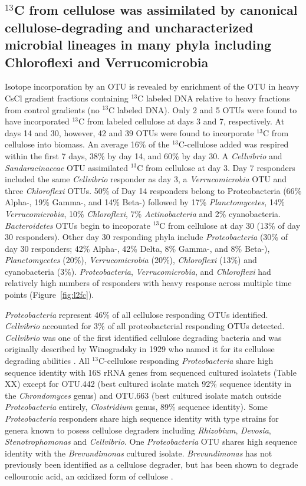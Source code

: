\subsection{$^{13}$C from cellulose was assimilated by canonical
cellulose-degrading and uncharacterized microbial lineages in many phyla
including Chloroflexi and Verrucomicrobia} 
Isotope incorporation by an OTU is revealed by enrichment of the OTU in heavy
CsCl gradient fractions containing $^{13}$C labeled DNA relative to heavy
fractions from control gradients (no $^{13}$C labeled DNA). Only 2 and 5 OTUs
were found to have incorporated $^{13}$C from labeled cellulose at days 3 and
7, respectively. At days 14 and 30, however, 42 and 39
OTUs were found to incorporate $^{13}$C from cellulose into biomass. An average
16\% of the $^{13}$C-cellulose added was respired within the first 7 days, 38\%
by day 14, and 60\% by day 30. A \textit{Cellvibrio} and
\textit{Sandaracinaceae} OTU assimilated $^{13}$C from cellulose at day 3. Day
7 responders included the same \textit{Cellvibrio} responder as day 3, a
\textit{Verrucomicrobia} OTU and three \textit{Chloroflexi} OTUs. 50\% of Day
14 responders belong to Proteobacteria (66\% Alpha-, 19\% Gamma-, and 14\%
Beta-) followed by 17\% \textit{Planctomycetes}, 14\% \textit{Verrucomicrobia},
10\% \textit{Chloroflexi}, 7\% \textit{Actinobacteria} and 2\%
cyanobacteria. \textit{Bacteroidetes} OTUs begin to incoporate
$^{13}$C from cellulose at day 30 (13\% of day 30 responders). Other day 30
responding phyla include \textit{Proteobacteria} (30\% of day 30 responders;
42\% Alpha-, 42\% Delta, 8\% Gamma-, and 8\% Beta-), \textit{Planctomycetes}
(20\%), \textit{Verrucomicrobia} (20\%), \textit{Chloroflexi} (13\%) and
cyanobacteria (3\%). \textit{Proteobacteria},
\textit{Verrucomicrobia}, and \textit{Chloroflexi} had relatively high numbers
of responders with heavy response across multiple time points
(Figure~\ref{fig:l2fc}).

\textit{Proteobacteria} represent 46\% of all cellulose responding OTUs
identified. \textit{Cellvibrio} accounted for 3\% of all proteobacterial
responding OTUs detected. \textit{Cellvibrio} was one of the first identified
cellulose degrading bacteria and was originally described by Winogradsky in
1929 who named it for its cellulose degrading abilities
\citep{boone2001bergeys}. All $^{13}$C-cellulose responding
\textit{Proteobacteria} share high sequence identity with 16S rRNA genes from
sequenced cultured isolatets (Table XX) except for OTU.442 (best cultured
isolate match 92\% sequence identity in the \textit{Chrondomyces} genus) and
OTU.663 (best cultured isolate match outside \textit{Proteobacteria} entirely,
\textit{Clostridium} genus, 89\% sequence identity). Some
\textit{Proteobacteria} responders share high sequence identity with type
strains for genera known to posess cellulose degraders including
\textit{Rhizobium}, \textit{Devosia}, \textit{Stenotrophomonas} and
\textit{Cellvibrio}. One \textit{Proteobacteria} OTU shares high sequence
identity with the \textit{Brevundimonas} cultured isolate.
\textit{Brevundimonas} has not previously been identified as a cellulose
degrader, but has been shown to degrade cellouronic acid, an oxidized form of
cellulose \citep{Tavernier_2008}.

